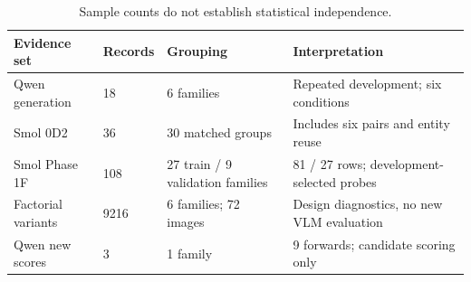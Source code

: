 \begin{table}[t]
\centering\small
\caption{Sample counts do not establish statistical independence.}
\label{tab:t2_dataset_independence}
\begin{tabularx}{\linewidth}{lXXX}
\toprule
Evidence set & Records & Grouping & Interpretation \\ \midrule
Qwen generation & 18 & 6 families & Repeated development; six conditions \\
Smol 0D2 & 36 & 30 matched groups & Includes six pairs and entity reuse \\
Smol Phase 1F & 108 & 27 train / 9 validation families & 81 / 27 rows; development-selected probes \\
Factorial variants & 9216 & 6 families; 72 images & Design diagnostics, no new VLM evaluation \\
Qwen new scores & 3 & 1 family & 9 forwards; candidate scoring only \\
\bottomrule
\end{tabularx}
\end{table}
